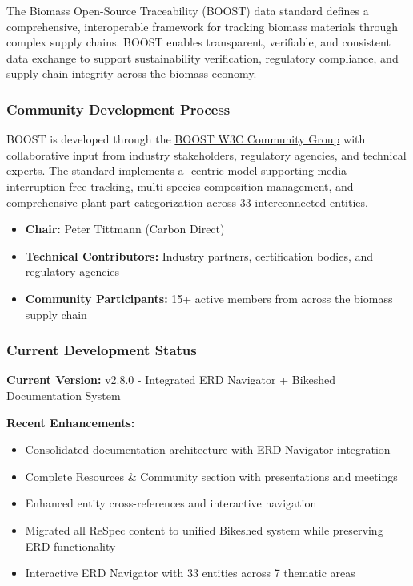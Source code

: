 
The Biomass Open-Source Traceability (BOOST) data standard defines a comprehensive, interoperable framework for tracking biomass materials through complex supply chains. BOOST enables transparent, verifiable, and consistent data exchange to support sustainability verification, regulatory compliance, and supply chain integrity across the biomass economy.

\subsubsection{Community Development Process}
\label{sec:community-development-process}

BOOST is developed through the \href{https://www.w3.org/community/boost-01/}{BOOST W3C Community Group} with collaborative input from industry stakeholders, regulatory agencies, and technical experts. The standard implements a \TRU-centric model supporting media-interruption-free tracking, multi-species composition management, and comprehensive plant part categorization across 33 interconnected entities.

\begin{informative}[title=Working Group Leadership]
\begin{itemize}
    \item \textbf{Chair:} Peter Tittmann (Carbon Direct)
    \item \textbf{Technical Contributors:} Industry partners, certification bodies, and regulatory agencies  
    \item \textbf{Community Participants:} 15+ active members from across the biomass supply chain
\end{itemize}
\end{informative}

\subsubsection{Current Development Status}
\label{sec:development-status}

\begin{important}[title=Current Version Information]
\textbf{Current Version:} v2.8.0 - Integrated ERD Navigator + Bikeshed Documentation System

\textbf{Recent Enhancements:}
\begin{itemize}
    \item Consolidated documentation architecture with ERD Navigator integration
    \item Complete Resources \& Community section with presentations and meetings
    \item Enhanced entity cross-references and interactive navigation  
    \item Migrated all ReSpec content to unified Bikeshed system while preserving ERD functionality
    \item Interactive ERD Navigator with 33 entities across 7 thematic areas
\end{itemize}
\end{important}

